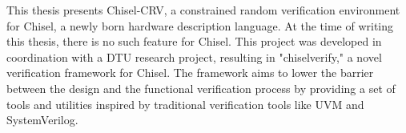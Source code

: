  This thesis presents Chisel-CRV, a constrained random verification environment
 for Chisel, a newly born hardware description language. At the time of writing
 this thesis, there is no such feature for Chisel. This project was developed in
 coordination with a DTU research project, resulting in "chiselverify," a novel
 verification framework for Chisel. The framework aims to lower the barrier
 between the design and the functional verification process by providing a set
 of tools and utilities inspired by traditional verification tools like UVM and
 SystemVerilog.





